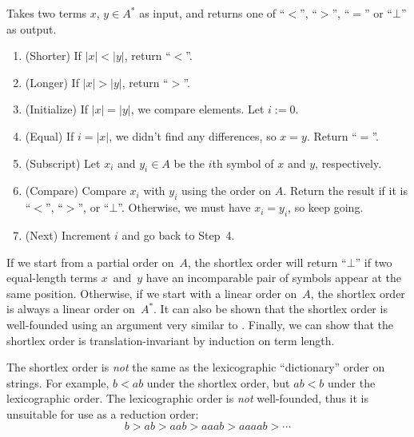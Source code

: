 \documentclass[../generics]{subfiles}
\begin{document}
\begin{algorithm}\label{shortlex}
Takes two terms $x$, $y\in A^*$ as input, and returns one of ``$<$'', ``$>$'', ``$=$'' or \index{$\bot$}``$\bot$'' as output.
\begin{enumerate}
\item (Shorter) If $|x|<|y|$, return ``$<$''.
\item (Longer) If $|x|>|y|$, return ``$>$''.
\item (Initialize) If $|x|=|y|$, we compare elements. Let $i:=0$.
\item (Equal) If $i=|x|$, we didn't find any differences, so $x=y$. Return ``$=$''.
\item (Subscript) Let $x_i$ and $y_i\in A$ be the $i$th symbol of $x$ and $y$, respectively.
\item (Compare) Compare $x_i$ with $y_i$ using the order on $A$. Return the result if it is ``$<$'', ``$>$'', or ``$\bot$''. Otherwise, we must have $x_i=y_i$, so keep going.
\item (Next) Increment $i$ and go back to Step~4.
\end{enumerate}
\end{algorithm}
If we start from a partial order on~$A$, the shortlex order will return ``$\bot$'' if two equal-length terms $x$~and~$y$ have an incomparable pair of symbols appear at the same position. Otherwise, if we start with a linear order on~$A$, the shortlex order is always a linear order on~$A^*$. It can also be shown that the shortlex order is well-founded using an argument very similar to . Finally, we can show that the shortlex order is translation-invariant by induction on term length.

\begin{example}
The shortlex order is \emph{not} the same as the lexicographic ``dictionary'' order on strings. For example, $b<ab$ under the shortlex order, but $ab<b$ under the lexicographic order. The lexicographic order is \emph{not} well-founded, thus it is unsuitable for use as a reduction order:
\[b>ab>aab>aaab>aaaab>\cdots\]
\end{example}
\end{document}
